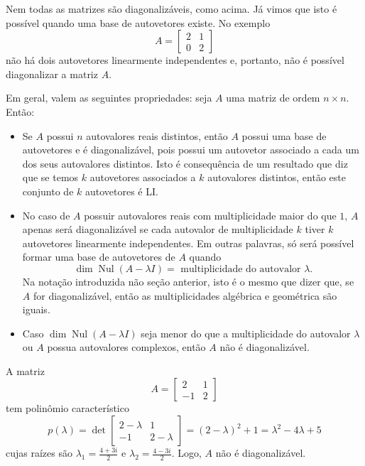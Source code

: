 Nem todas as matrizes são diagonalizáveis, como acima. Já vimos que isto é possível quando uma base de autovetores existe. No exemplo
\begin{equation}
A = \begin{bmatrix}
2 & 1 \\
0 & 2
\end{bmatrix}
\end{equation} não há dois autovetores linearmente independentes e, portanto, não é possível diagonalizar a matriz $A$.


\vspace{0.3cm}

Em geral, valem as seguintes propriedades: seja $A$ uma matriz de ordem $n \times n$. Então:
\begin{itemize}
	\item Se $A$ possui $n$ autovalores reais distintos, então $A$ possui uma base de autovetores e é diagonalizável, pois possui um autovetor associado a cada um dos seus autovalores distintos. Isto é consequência de um resultado que diz que se temos $k$ autovetores associados a $k$ autovalores distintos, então este conjunto de $k$ autovetores é LI.
	\item No caso de $A$ possuir autovalores reais com multiplicidade maior do que $1$, $A$ apenas será diagonalizável se cada autovalor de multiplicidade $k$ tiver $k$ autovetores linearmente independentes. Em outras palavras, só será possível formar uma base de autovetores de $A$ quando
	\begin{equation}
	\operatorname{dim} \operatorname{Nul} (A - \lambda I) = \text{ multiplicidade do autovalor } \lambda.
	\end{equation} Na notação introduzida não seção anterior, isto é o mesmo que dizer que, se $A$ for diagonalizável, então as multiplicidades algébrica e geométrica são iguais.
	\item Caso $\dim \operatorname{Nul} (A - \lambda I)$ seja menor do que a multiplicidade do autovalor $\lambda$ ou $A$ possua autovalores complexos, então $A$ não é diagonalizável.
\end{itemize}


\begin{ex}
	A matriz
	\begin{equation}
	A = \begin{bmatrix}
	2  & 1 \\
	-1 & 2
	\end{bmatrix}
	\end{equation} tem polinômio característico
	\begin{equation}
	p(\lambda) = \det
	\begin{bmatrix}
	2-\lambda & 1 \\
	-1 & 2-\lambda
	\end{bmatrix} = (2-\lambda)^2 +1 = \lambda^2 -4\lambda +5
	\end{equation} cujas raízes são $\lambda_1 = \frac{4 + 3i}{2}$ e $\lambda_2 = \frac{4 - 3i}{2}$. Logo, $A$ não é diagonalizável.
\end{ex}

